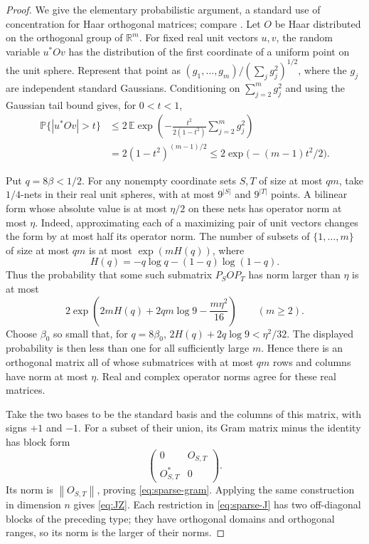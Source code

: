 \documentclass[11pt]{article}
\numberwithin{equation}{section}
\theoremstyle{definition}
\theoremstyle{remark}
\newcommand{\norm}[1]{\left\lVert#1\right\rVert}
\begin{document}
\begin{proof}
We give the elementary probabilistic argument, a standard use of
concentration for Haar orthogonal matrices; compare
\cite[Section~IV-B]{LyubarskiiVershynin}.
Let $O$ be Haar distributed on the orthogonal group of $\mathbb R^m$.
For fixed real unit vectors $u,v$, the random variable $u^*Ov$ has the
distribution of the first coordinate of a uniform point on the unit
sphere.  Represent that point as
$(g_1,\ldots,g_m)/(\sum_jg_j^2)^{1/2}$, where the $g_j$ are independent
standard Gaussians.  Conditioning on $\sum_{j=2}^m g_j^2$ and using the
Gaussian tail bound gives, for $0<t<1$,
\begin{align*}
 \mathbb P\{|u^*Ov|>t\}
 &\leq 2\,\mathbb E\exp\left(
   -\frac{t^2}{2(1-t^2)}\sum_{j=2}^m g_j^2\right)\\
 &=2(1-t^2)^{(m-1)/2}
 \leq 2\exp\bigl(-(m-1)t^2/2\bigr).
\end{align*}

Put $q=8\beta<1/2$.  For any nonempty coordinate sets $S,T$ of size at most
$q m$, take $1/4$-nets in their real unit spheres, with at most
$9^{|S|}$ and $9^{|T|}$ points.  A bilinear form whose absolute value is
at most $\eta/2$ on these nets has operator norm at most $\eta$.
Indeed, approximating each of a maximizing pair of unit vectors changes
the form by at most half its operator norm.  The number of subsets of
$\{1,\ldots,m\}$ of size at most $qm$ is at most
$\exp(mH(q))$, where
\[
 H(q)=-q\log q-(1-q)\log(1-q).
\]
Thus the probability that some such submatrix $P_SOP_T$ has norm
larger than $\eta$ is at most
\[
 2\exp\left(2mH(q)+2qm\log9-\frac{m\eta^2}{16}\right)
 \qquad(m\geq2).
\]
Choose $\beta_0$ so small that, for $q=8\beta_0$,
$2H(q)+2q\log9<\eta^2/32$.  The displayed probability is then less
than one for all sufficiently large $m$.  Hence there is an orthogonal
matrix all of whose submatrices with at most $qm$ rows and columns
have norm at most $\eta$.  Real and complex operator norms agree for
these real matrices.

Take the two bases to be the standard basis and the columns of this
matrix, with signs $+1$ and $-1$.  For a subset of their union, its Gram
matrix minus the identity has block form
\[
 \begin{pmatrix}0&O_{S,T}\\O_{S,T}^*&0\end{pmatrix}.
\]
Its norm is $\norm{O_{S,T}}$, proving
\eqref{eq:sparse-gram}.  Applying the same construction in dimension
$n$ gives \eqref{eq:JZ}.  Each restriction in
\eqref{eq:sparse-J} has two off-diagonal blocks of the preceding type;
they have orthogonal domains and orthogonal ranges, so its norm is the
larger of their norms.
\end{proof}
\end{document}
